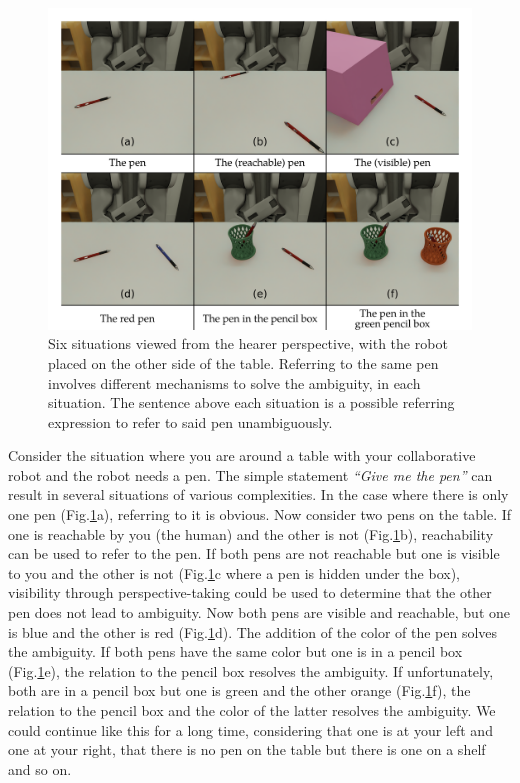 \begin{figure}[ht!]
\centering
\includegraphics[scale=0.16]{figures/chapter4/intro.png}
\caption{\label{fig:chap4_intro} Six situations viewed from the hearer perspective, with the robot placed on the other side of the table. Referring to the same pen involves different mechanisms to solve the ambiguity, in each situation. The sentence above each situation is a possible referring expression to refer to said pen unambiguously. }
\end{figure}

Consider the situation where you are around a table with your collaborative robot and the robot needs a pen. The simple statement \textit{``Give me the pen''} can result in several situations of various complexities. In the case where there is only one pen (Fig.\ref{fig:chap4_intro}a), referring to it is obvious. Now consider two pens on the table. If one is reachable by you (the human) and the other is not (Fig.\ref{fig:chap4_intro}b), reachability can be used to refer to the pen. If both pens are not reachable but one is visible to you and the other is not (Fig.\ref{fig:chap4_intro}c where a pen is hidden under the box), visibility through perspective-taking could be used to determine that the other pen does not lead to ambiguity. Now both pens are visible and reachable, but one is blue and the other is red (Fig.\ref{fig:chap4_intro}d). The addition of the color of the pen solves the ambiguity. If both pens have the same color but one is in a pencil box (Fig.\ref{fig:chap4_intro}e), the relation to the pencil box resolves the ambiguity. If unfortunately, both are in a pencil box but one is green and the other orange (Fig.\ref{fig:chap4_intro}f), the relation to the pencil box and the color of the latter resolves the ambiguity. We could continue like this for a long time, considering that one is at your left and one at your right, that there is no pen on the table but there is one on a shelf and so on.


